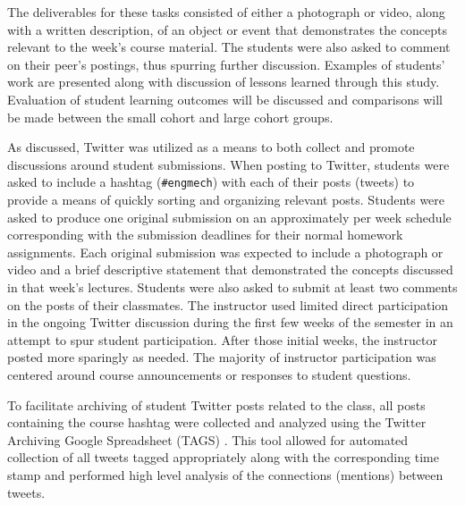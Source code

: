 \documentclass[12pt]{article}
\begin{document}
The deliverables for these tasks consisted of either a photograph or video, along with a written description, of an object or event that demonstrates the concepts relevant to the week's course material. The students were also asked to comment on their peer's postings, thus spurring further discussion. Examples of students' work are presented along with discussion of lessons learned through this study. Evaluation of student learning outcomes will be discussed and comparisons will be made between the small cohort and large cohort groups.

As discussed, Twitter was utilized as a means to both collect and promote discussions around student submissions. When posting to Twitter, students were asked to include a hashtag (\texttt{\#engmech}) with each of their posts (tweets) to provide a means of quickly sorting and organizing relevant posts. Students were asked to produce one original submission on an approximately per week schedule corresponding with the submission deadlines for their normal homework assignments. Each original submission was expected to include a photograph or video and a brief descriptive statement that demonstrated  the concepts discussed in that week's lectures. Students were also asked to submit at least two comments on the posts of their classmates. The instructor used limited direct participation in the ongoing Twitter discussion during the first few weeks of the semester in an attempt to spur student participation. After those initial weeks, the instructor posted more sparingly as needed. The majority of instructor participation was centered around course announcements or responses to student questions.

To facilitate archiving of student Twitter posts related to the class, all posts containing the course hashtag were collected and analyzed using the Twitter Archiving Google Spreadsheet (TAGS) \cite{hawksey_twitter_2014}. This tool allowed for automated collection of all tweets tagged appropriately along with the corresponding time stamp and performed high level analysis of the connections (mentions) between tweets.



\vspace{4\baselineskip}\vspace{-\parskip} %
\footnotesize %


\end{document}
